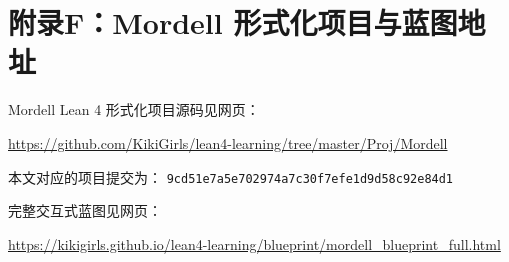 \newpage
{}
\section*{附录F：Mordell 形式化项目与蓝图地址}
\begingroup
\setlength{\parindent}{0pt}
\setlength{\parskip}{0.35\baselineskip}

Mordell Lean 4 形式化项目源码见网页：

\url{https://github.com/KikiGirls/lean4-learning/tree/master/Proj/Mordell}

本文对应的项目提交为：
\texttt{9cd51e7a5e702974a7c30f7efe1d9d58c92e84d1}

完整交互式蓝图见网页：

\url{https://kikigirls.github.io/lean4-learning/blueprint/mordell_blueprint_full.html}

\endgroup
